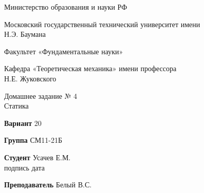 \documentclass{article}
\begin{document}




\thispagestyle{empty}

\begingroup
\setlength{\parindent}{0pt}

\begin{bfseries}

\vspace*{0cm}
Министерство образования и науки РФ

\vspace{2cm}
Московский государственный технический университет имени\\Н.Э. Баумана

\vspace{2cm}
Факультет «Фундаментальные науки»

\vspace{2cm}
Кафедра «Теоретическая механика» имени профессора\\ Н.Е. Жуковского

\vspace{2cm}

Домашнее задание № 4\\
Статика

\end{bfseries}

\vspace{2cm}

\textbf{Вариант} \hspace{0.5cm} 20

\vspace{0.5cm}

\textbf{Группа} \hspace{0.5cm} СМ11-21Б

\vspace{0.5cm}

\textbf{Студент} \hspace{0.5cm} Усачев Е.М. \hspace{1.5cm} \underline{\hspace{3cm}} 
\hspace{1cm}\underline{\hspace{3cm}}\\
\small\hspace*{8.5cm} подпись \hspace{2.7 cm} дата \normalsize

\vspace{0cm}
\textbf{Преподаватель} \hspace{0.5cm} Белый В.С.


\vfill
\end{document}
